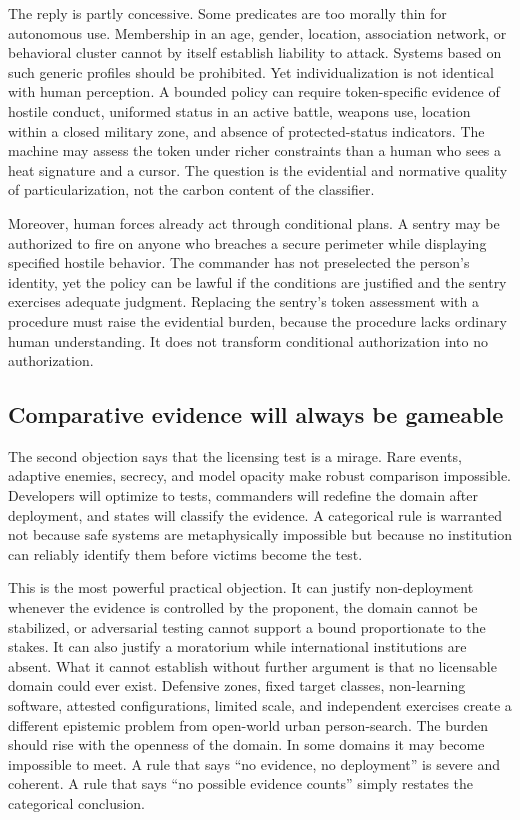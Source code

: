 \documentclass[11pt]{article}
\begin{document}
The reply is partly concessive. Some predicates are too morally thin for autonomous use. Membership in an age, gender, location, association network, or behavioral cluster cannot by itself establish liability to attack. Systems based on such generic profiles should be prohibited. Yet individualization is not identical with human perception. A bounded policy can require token-specific evidence of hostile conduct, uniformed status in an active battle, weapons use, location within a closed military zone, and absence of protected-status indicators. The machine may assess the token under richer constraints than a human who sees a heat signature and a cursor. The question is the evidential and normative quality of particularization, not the carbon content of the classifier.

Moreover, human forces already act through conditional plans. A sentry may be authorized to fire on anyone who breaches a secure perimeter while displaying specified hostile behavior. The commander has not preselected the person's identity, yet the policy can be lawful if the conditions are justified and the sentry exercises adequate judgment. Replacing the sentry's token assessment with a procedure must raise the evidential burden, because the procedure lacks ordinary human understanding. It does not transform conditional authorization into no authorization.

\subsection{Comparative evidence will always be gameable}

The second objection says that the licensing test is a mirage. Rare events, adaptive enemies, secrecy, and model opacity make robust comparison impossible. Developers will optimize to tests, commanders will redefine the domain after deployment, and states will classify the evidence. A categorical rule is warranted not because safe systems are metaphysically impossible but because no institution can reliably identify them before victims become the test.

This is the most powerful practical objection. It can justify non-deployment whenever the evidence is controlled by the proponent, the domain cannot be stabilized, or adversarial testing cannot support a bound proportionate to the stakes. It can also justify a moratorium while international institutions are absent. What it cannot establish without further argument is that no licensable domain could ever exist. Defensive zones, fixed target classes, non-learning software, attested configurations, limited scale, and independent exercises create a different epistemic problem from open-world urban person-search. The burden should rise with the openness of the domain. In some domains it may become impossible to meet. A rule that says ``no evidence, no deployment'' is severe and coherent. A rule that says ``no possible evidence counts'' simply restates the categorical conclusion.
\end{document}
